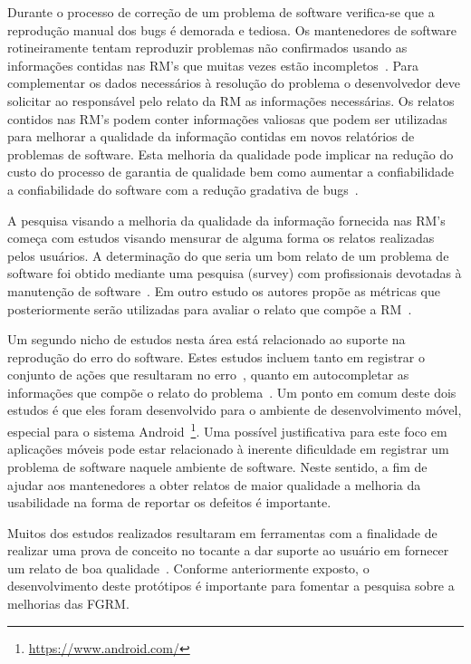 Durante o processo de correção de um problema de software verifica-se que a
reprodução manual dos bugs é demorada e tediosa. Os mantenedores de software
rotineiramente tentam reproduzir problemas não confirmados usando as informações
contidas nas RM's que muitas vezes estão
incompletos~\cite{White:2015:GRR:2820282.2820291}. Para complementar os dados
necessários à resolução do problema o desenvolvedor deve solicitar ao
responsável pelo relato da RM as informações necessárias. Os relatos
contidos nas RM's podem conter informações valiosas que podem ser
utilizadas para melhorar a qualidade da informação contidas em novos relatórios
de problemas de software. Esta melhoria da qualidade pode implicar na redução do
custo do processo de garantia de qualidade bem como aumentar a
confiabilidade a confiabilidade do software com a redução gradativa de
bugs~\cite{Tu:2014:MQI:2677832.2677844}.

A pesquisa visando a melhoria da qualidade da informação fornecida nas RM's
começa com estudos visando mensurar de alguma forma os relatos realizadas pelos
usuários. A determinação do que seria um bom relato de um problema de software
foi obtido mediante uma pesquisa (survey) com profissionais devotadas à
manutenção de software~\cite{Bettenburg2008a}. Em outro estudo os autores propõe
as métricas que posteriormente serão utilizadas para avaliar o relato que compõe
a RM~\cite{Tu:2014:MQI:2677832.2677844}.

Um segundo nicho de estudos  nesta área está relacionado ao suporte na
reprodução do erro do software. Estes estudos incluem tanto em registrar o
conjunto de ações que resultaram no erro~\cite{White:2015:GRR:2820282.2820291},
quanto em autocompletar as informações que compõe o relato do
problema~\cite{moran2015auto}. Um ponto em comum deste dois estudos é que eles
foram desenvolvido para o ambiente de desenvolvimento móvel, especial para o
sistema Android~\footnote{\url{https://www.android.com/}}. Uma possível
justificativa para este foco em aplicações móveis pode estar relacionado à
inerente dificuldade em registrar um problema de software naquele ambiente de
software. Neste sentido, a fim de ajudar aos mantenedores a obter relatos de
maior qualidade a melhoria da usabilidade na forma de reportar os defeitos é
importante.

Muitos dos estudos realizados resultaram em ferramentas com a finalidade de
realizar uma prova de conceito no tocante a dar suporte ao usuário em fornecer
um relato de boa qualidade~\cite{Tu:2014:MQI:2677832.2677844, Bettenburg2008a,
	Wu2011a,White:2015:GRR:2820282.2820291,moran2015auto}. Conforme
anteriormente exposto, o desenvolvimento deste protótipos é importante para
fomentar a pesquisa sobre a melhorias das FGRM\@.

